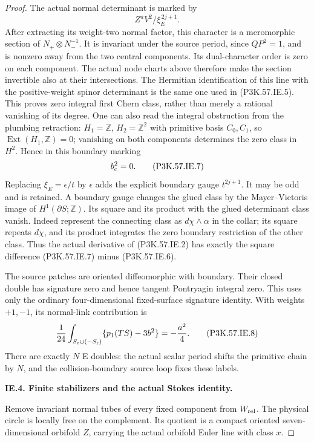 \begin{proof}
The actual normal determinant is marked by
\[
                         Z^aV^2/\xi_E^{\,2j+1}.
\]
After extracting its weight-two normal factor,
this character is a meromorphic section of
\(N_+\otimes N_-^{-1}\). It is invariant under the
source period, since \(QP^2=1\), and is nonzero
away from the two central components. Its
dual-character order is zero on each component.
The actual node charts above therefore make the
section invertible also at their intersections.
The Hermitian identification of this line with
the positive-weight spinor determinant is the
same one used in (P3K.57.IE.5). This proves zero
integral first Chern class, rather than merely
a rational vanishing of its degree. One can also
read the integral obstruction from the plumbing
retraction: \(H_1=\mathbb Z\), \(H_2=\mathbb Z^2\)
with primitive basis \(C_0,C_1\), so
\(\operatorname{Ext}(H_1,\mathbb Z)=0\); vanishing
on both components determines the zero class
in \(H^2\). Hence in this boundary marking
\[
                               b_{\rm c}^2=0.           \tag{P3K.57.IE.7}
\]
Replacing \(\xi_E=\epsilon/t\) by \(\epsilon\)
adds the explicit boundary gauge \(t^{2j+1}\).
It may be odd and is retained. A boundary
gauge changes the glued class by the
Mayer--Vietoris image of \(H^1(\partial S;\mathbb Z)\).
Its square and its product with the glued
determinant class vanish. Indeed represent
the connecting class as \(d\chi\wedge\alpha\)
in the collar; its square repeats \(d\chi\),
and its product integrates the zero boundary
restriction of the other class. Thus the
actual derivative of (P3K.57.IE.2) has exactly the
square difference (P3K.57.IE.7) minus (P3K.57.IE.6).

The source patches are oriented diffeomorphic
with boundary. Their closed double has
signature zero and hence tangent Pontryagin
integral zero. This uses only the ordinary
four-dimensional fixed-surface signature
identity. With weights \(+1,-1\), its
normal-link contribution is
\[
 \frac1{24}\int_{S_{\rm c}\cup(-S_{\rm r})}
            \{p_1(TS)-3b^2\}=-\frac{a^2}{4}.           \tag{P3K.57.IE.8}
\]
There are exactly \(N\) E doubles: the actual
scalar period shifts the primitive chain by
\(N\), and the collision-boundary source
loop fixes these labels.

\par\medskip\noindent\textbf{IE.4. Finite stabilizers and the actual Stokes identity.}\par\nopagebreak[4]

Remove invariant normal tubes of every fixed
component from \(W_{\rm rel}\). The physical
circle is locally free on the complement.
Its quotient is a compact oriented
seven-dimensional orbifold \(Z\), carrying
the actual orbifold Euler line with class \(x\).


\end{proof}
